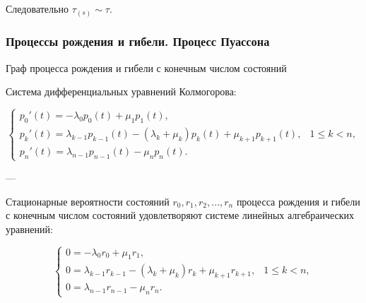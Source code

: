 Следовательно $\tau_{(s)} \sim \tau$.

\subsubsection*{Процессы рождения и гибели. Процесс Пуассона}

Граф процесса рождения и гибели с конечным числом состояний

\begin{center}
\end{center}

Система дифференциальных уравнений Колмогорова:

\[
	\begin{cases}
		p_0'(t) = -\lambda_0 p_0(t) + \mu_1 p_1(t), \\[4pt]
		p_k'(t) = \lambda_{k-1} p_{k-1}(t)
		- (\lambda_k + \mu_k) p_k(t)
		+ \mu_{k+1} p_{k+1}(t),
		 & 1 \le k < n,                             \\[4pt]
		p_n'(t) = \lambda_{n-1} p_{n-1}(t) - \mu_n p_n(t).
	\end{cases}
\]

---

Стационарные вероятности состояний $r_0, r_1, r_2, \ldots, r_n$ процесса рождения и гибели
с конечным числом состояний удовлетворяют системе линейных алгебраических уравнений:

\[
	\begin{cases}
		0 = -\lambda_0 r_0 + \mu_1 r_1, \\[4pt]
		0 = \lambda_{k-1} r_{k-1} - (\lambda_k + \mu_k) r_k + \mu_{k+1} r_{k+1},
		 & 1 \le k < n,                 \\[4pt]
		0 = \lambda_{n-1} r_{n-1} - \mu_n r_n.
	\end{cases}
\]

